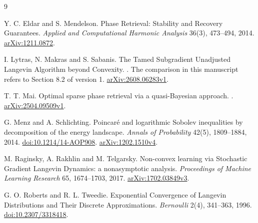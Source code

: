 \documentclass[11pt,letterpaper]{article}
\numberwithin{equation}{section}
\theoremstyle{remark}
\newcommand{\1}{\mathbf 1}
\begin{document}
\begin{thebibliography}{9}

Y. C. Eldar and S. Mendelson.
\newblock Phase Retrieval: Stability and Recovery Guarantees.
\newblock \emph{Applied and Computational Harmonic Analysis} 36(3), 473--494, 2014.
\newblock \href{https://arxiv.org/abs/1211.0872}{arXiv:1211.0872}.

I. Lytras, N. Makras and S. Sabanis.
\newblock The Tamed Subgradient Unadjusted Langevin Algorithm beyond Convexity.
. The comparison in this manuscript refers to Section 8.2 of version 1.
\newblock \href{https://arxiv.org/html/2608.06283v1}{arXiv:2608.06283v1}.

T. T. Mai.
\newblock Optimal sparse phase retrieval via a quasi-Bayesian approach.
.
\newblock \href{https://arxiv.org/html/2504.09509v1}{arXiv:2504.09509v1}.

G. Menz and A. Schlichting.
\newblock Poincar\'e and logarithmic Sobolev inequalities by decomposition of the energy landscape.
\newblock \emph{Annals of Probability} 42(5), 1809--1884, 2014.
\newblock \href{https://doi.org/10.1214/14-AOP908}{doi:10.1214/14-AOP908}.
\newblock \href{https://arxiv.org/abs/1202.1510v4}{arXiv:1202.1510v4}.

M. Raginsky, A. Rakhlin and M. Telgarsky.
\newblock Non-convex learning via Stochastic Gradient Langevin Dynamics: a nonasymptotic analysis.
\newblock \emph{Proceedings of Machine Learning Research} 65, 1674--1703, 2017.
\newblock \href{https://arxiv.org/html/1702.03849v3}{arXiv:1702.03849v3}.

G. O. Roberts and R. L. Tweedie.
\newblock Exponential Convergence of Langevin Distributions and Their Discrete Approximations.
\newblock \emph{Bernoulli} 2(4), 341--363, 1996.
\newblock \href{https://doi.org/10.2307/3318418}{doi:10.2307/3318418}.

\end{thebibliography}
\end{document}
